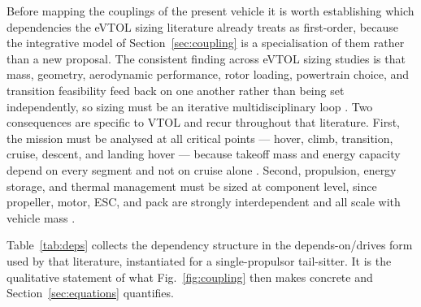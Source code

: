 Before mapping the couplings of the present vehicle it is worth
establishing which dependencies the eVTOL sizing literature already
treats as first-order, because the integrative model of
Section~\ref{sec:coupling} is a specialisation of them rather than a new
proposal. The consistent finding across eVTOL sizing studies is that
mass, geometry, aerodynamic performance, rotor loading, powertrain
choice, and transition feasibility feed back on one another rather than
being set independently, so sizing must be an iterative
multidisciplinary loop \citep{tyan2017,ugwueze2023,zhang2024evtol}. Two
consequences are specific to VTOL and recur throughout that literature.
First, the mission must be analysed at all critical points --- hover,
climb, transition, cruise, descent, and landing hover --- because
takeoff mass and energy capacity depend on every segment and not on
cruise alone \citep{tyan2017,ugwueze2022,hu2022}. Second, propulsion,
energy storage, and thermal management must be sized at component level,
since propeller, motor, ESC, and pack are strongly interdependent and
all scale with vehicle mass \citep{chahba2023,an2022,albamaestre2021}.

Table~\ref{tab:deps} collects the dependency structure in the
depends-on/drives form used by that literature, instantiated for a
single-propulsor tail-sitter. It is the qualitative statement of what
Fig.~\ref{fig:coupling} then makes concrete and
Section~\ref{sec:equations} quantifies.

